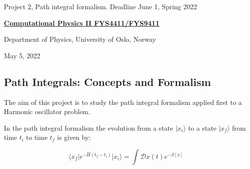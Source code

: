 \documentclass[%
oneside,                 %
final,                   %
10pt]{article}
\begin{document}

\newcommand{\exercisesection}[1]{\subsection*{#1}}






\thispagestyle{empty}

\begin{center}
{\LARGE\bf
\begin{spacing}{1.25}
Project 2, Path integral formalism. Deadline June 1, Spring 2022
\end{spacing}
}
\end{center}


\begin{center}
{\bf \href{{http://www.uio.no/studier/emner/matnat/fys/FYS4411/index-eng.html}}{Computational Physics II FYS4411/FYS9411}}
\end{center}

    \begin{center}
\centerline{{\small Department of Physics, University of Oslo, Norway}}
\end{center}
    

\begin{center}
May 5, 2022
\end{center}

\vspace{1cm}


\subsection*{Path Integrals: Concepts and Formalism}

The aim of this project is to study the path integral formalism applied first to a Harmonic oscillator problem.

In the path integral formalism the evolution from a state $\vert x_i\rangle$
to a state $\vert  x_f\rangle$ from time $t_i$ to time $t_f$ is given by:

\[
	\langle x_f\vert e^{-\hat{H}(t_f-t_i)}\vert x_i\rangle = \int \mathcal{D} x(t) e^{-S[x]}
\]
\end{document}
